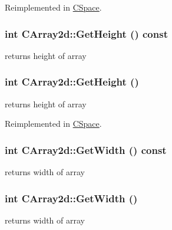 Reimplemented in \hyperlink{classCSpace_afe1840ea70f14055a39090ceaec9778e}{CSpace}.\hypertarget{classCArray2d_afbfa71015584fcb399c6fde2fa9be1b0}{
\subsubsection[{GetHeight}]{\setlength{\rightskip}{0pt plus 5cm}int CArray2d::GetHeight () const}}
\label{classCArray2d_afbfa71015584fcb399c6fde2fa9be1b0}
returns height of array \hypertarget{classCArray2d_ae019e1beca716a4ea7d368e342fe23a1}{
\subsubsection[{GetHeight}]{\setlength{\rightskip}{0pt plus 5cm}int CArray2d::GetHeight ()}}
\label{classCArray2d_ae019e1beca716a4ea7d368e342fe23a1}
returns height of array 

Reimplemented in \hyperlink{classCSpace_a00b9bce5ca8303b7bae59e2ab6ce98be}{CSpace}.\hypertarget{classCArray2d_a021336ae61eb605e5d534722259d3c62}{
\subsubsection[{GetWidth}]{\setlength{\rightskip}{0pt plus 5cm}int CArray2d::GetWidth () const}}
\label{classCArray2d_a021336ae61eb605e5d534722259d3c62}
returns width of array \hypertarget{classCArray2d_a7cfeb98b3112d1e147464a7ec2374579}{
\subsubsection[{GetWidth}]{\setlength{\rightskip}{0pt plus 5cm}int CArray2d::GetWidth ()}}
\label{classCArray2d_a7cfeb98b3112d1e147464a7ec2374579}
returns width of array 

